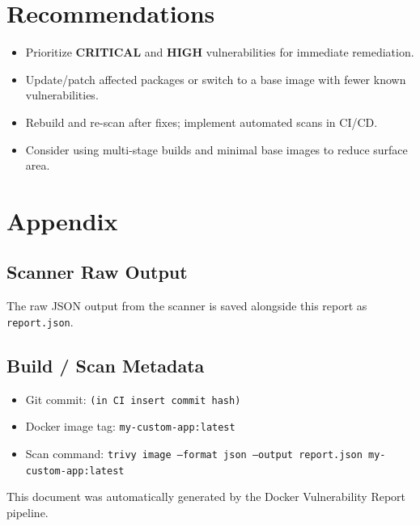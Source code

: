 \documentclass[10pt]{article}
\begin{document}
\section*{Recommendations}
\begin{itemize}
  \item Prioritize \textbf{CRITICAL} and \textbf{HIGH} vulnerabilities for immediate remediation.
  \item Update/patch affected packages or switch to a base image with fewer known vulnerabilities.
  \item Rebuild and re-scan after fixes; implement automated scans in CI/CD.
  \item Consider using multi-stage builds and minimal base images to reduce surface area.
\end{itemize}

\bigskip

\section*{Appendix}
\subsection*{Scanner Raw Output}
\noindent The raw JSON output from the scanner is saved alongside this report as \texttt{report.json}.

\vspace{8pt}
\subsection*{Build / Scan Metadata}
\begin{itemize}
  \item Git commit: \texttt{(in CI insert commit hash)}
  \item Docker image tag: \texttt{my-custom-app:latest}
  \item Scan command: \texttt{trivy image --format json --output report.json my-custom-app:latest}
\end{itemize}

\vfill
\begin{center}
  \small This document was automatically generated by the Docker Vulnerability Report pipeline.
\end{center}
\end{document}
